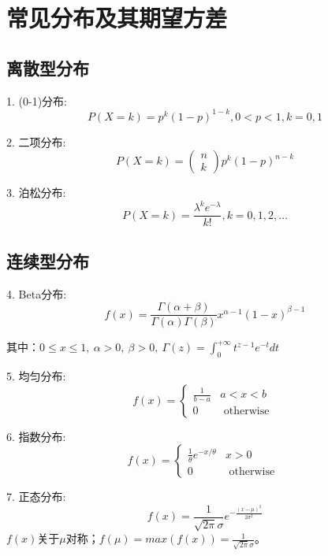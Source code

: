 \section{常见分布及其期望方差}
\subsection{离散型分布}
1. (0-1)分布:
\begin{equation}
    P(X=k)=p^{k}(1-p)^{1-k}, 0<p<1, k=0,1
\end{equation}

2. 二项分布: 
\begin{equation}
    P(X=k)=\left(\begin{array}{l}n \\k\end{array}\right) p^{k}(1-p)^{n-k}
\end{equation}

3. 泊松分布: 
\begin{equation}
    P(X=k)=\frac{\lambda^{k} e^{-\lambda}}{k !}, k=0,1,2, \ldots
\end{equation}
\subsection{连续型分布}
4. Beta分布: 
   \begin{equation}
    f(x)=\frac{\Gamma(\alpha+\beta)}{\Gamma(\alpha) \Gamma(\beta)} x^{\alpha-1}(1-x)^{\beta-1}
   \end{equation}
   
   其中：$0\leq x\leq 1, \ \alpha>0,\ \beta>0,\ \Gamma(z)=\int_{0}^{+\infty} t^{z-1} e^{-t} d t$

5. 均匀分布: 
   \begin{equation}
        f(x)=\left\{\begin{array}{ll}\frac{1}{b-a} & a<x<b \\0 & \text { otherwise }\end{array}\right.
   \end{equation}
   
6. 指数分布: 
\begin{equation}
    f(x)=\left\{\begin{array}{ll}\frac{1}{\theta} e^{-x / \theta} & x>0 \\0 & \text { otherwise }\end{array}\right.
\end{equation}

7. 正态分布: 
\begin{equation}
    f(x)=\frac{1}{\sqrt{2 \pi} \sigma} e^{-\frac{(x-\mu)^{2}}{2 \sigma^{2}}}
\end{equation}
   $f(x)$关于$\mu$对称；$f(\mu)=max(f(x))=\frac{1}{\sqrt{2\pi}\sigma}$。

